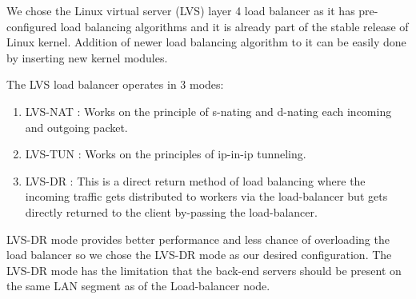 \documentclass[hidelinks]{report}
\begin{document}
We chose the Linux virtual server (LVS) layer 4 load balancer as it has pre-configured load balancing algorithms and it is already part of the stable release of Linux kernel. Addition of newer load balancing algorithm to it can be easily done by inserting new kernel modules.

\par The LVS load balancer operates in 3 modes:

\begin{enumerate}
\item 
LVS-NAT : Works on the principle of s-nating and d-nating each incoming and outgoing packet. 
\item
LVS-TUN : Works on the principles of ip-in-ip tunneling. 
\item
LVS-DR : This is a direct return method of load balancing where the incoming traffic gets distributed to workers via the load-balancer but gets directly returned to the client by-passing the load-balancer. 
\end{enumerate}
\par LVS-DR mode provides better performance and less chance of overloading the load balancer so we chose the LVS-DR mode as our desired configuration. The LVS-DR mode has the limitation that the back-end servers should be present on the same LAN segment as of the Load-balancer node.
\end{document}

